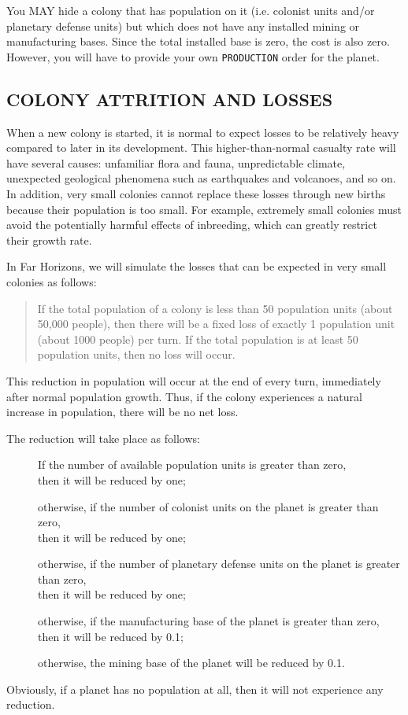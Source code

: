 \documentclass[10pt,titlepage]{article}
\begin{document}
You MAY hide a colony that has population on it (i.e. colonist units and/or
planetary defense units) but which does not have any installed mining or
manufacturing bases.  Since the total installed base is zero, the cost is also
zero.  However, you will have to provide your own \texttt{PRODUCTION} order for the
planet.


\subsection{COLONY ATTRITION AND LOSSES}
\label{sec:colorattritionlosses}


When a new colony is started, it is normal to expect losses to be relatively
heavy compared to later in its development.  This higher-than-normal casualty
rate will have several causes: unfamiliar flora and fauna, unpredictable
climate, unexpected geological phenomena such as earthquakes and volcanoes, and
so on.  In addition, very small colonies cannot replace these losses through
new births because their population is too small.  For example, extremely small
colonies must avoid the potentially harmful effects of inbreeding, which can
greatly restrict their growth rate.

In Far Horizons, we will simulate the losses that can be expected in very small
colonies as follows:

\begin{quotation}
	If the total population of a colony is less than 50 population
	units (about 50,000 people), then there will be a fixed loss of
	exactly 1 population unit (about 1000 people) per turn.  If the
	total population is at least 50 population units, then no loss
	will occur.\end{quotation} 

This reduction in population will occur at the end of every turn, immediately
after normal population growth.  Thus, if the colony experiences a natural
increase in population, there will be no net loss.

The reduction will take place as follows:
\begin{description}

	 \item[]If the number of available population units is greater than zero, \\
		then it will be reduced by one;
 \item[]	otherwise, if the number of colonist units on the planet is greater than zero, \\
		then it will be reduced by one;
	 \item[]otherwise, if the number of planetary defense units on the planet is greater than zero, \\ 
		then it will be reduced by one;
	 \item[]otherwise, if the manufacturing base of the planet is greater than zero, \\ 
		then it will be reduced by 0.1;
	 \item[]otherwise, the mining base of the planet will be reduced by 0.1.
\end{description}
Obviously, if a planet has no population at all, then it will not experience
any reduction.
\end{document}
